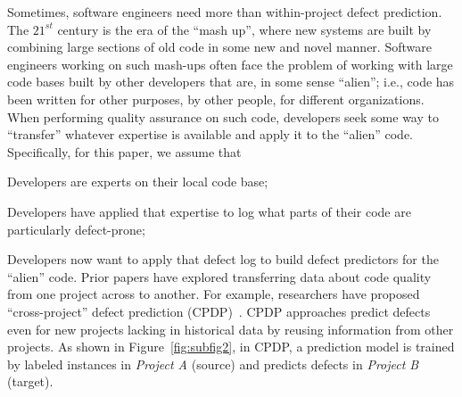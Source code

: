 Sometimes, software engineers
need more than within-project defect prediction.
The $21^{\mathit{st}}$ century is the era of the ``mash up'',
where new systems are built by combining large sections of old
code in some new and novel manner.
Software engineers working on such mash-ups often face
the problem of working with  large code bases built by other developers that are, in some sense ``alien''; i.e.,
code has been written for other purposes, 
by other people, for different organizations.  When performing
quality assurance on such code, developers
seek some way to ``transfer'' whatever expertise is
available and apply it to the ``alien'' code.  
Specifically, for this
paper, we assume that
\bi
\item
Developers are experts on  their local code base;
\item
Developers have applied that expertise to log what parts
of their code are particularly defect-prone;
\item
Developers now want to apply that defect log to
build defect predictors for the ``alien'' code.
\ei
Prior papers have explored transferring data
about code quality from one project across to another.
For example, researchers
have proposed ``cross-project'' defect
prediction (CPDP)~\cite{He12, Ma12, Nam13, Rahman12, Turhan09, Zimmermann09}.
CPDP approaches predict defects even for new projects lacking
in historical data by reusing information from other projects. As shown in Figure~\ref{fig:subfig2}, in CPDP,
a prediction model is trained by
labeled instances in {\em Project A} (source) and predicts defects in {\em Project B} (target).

% 


